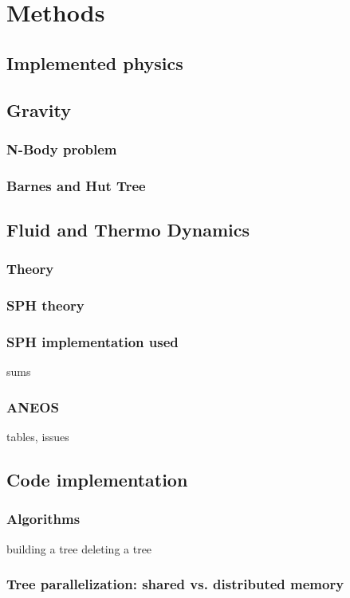 \graphicspath{{./02figs/}}

\chapter{Methods}
%

\section{Implemented physics}
\section{Gravity}
\subsection{N-Body problem}
\subsection{Barnes and Hut Tree}

\section{Fluid and Thermo Dynamics}
\subsection{Theory}
\subsection{SPH theory}
\subsection{SPH implementation used}
sums
\subsection{ANEOS}
tables, issues

\section{Code implementation}
\subsection{Algorithms}
building a tree
deleting a tree

\subsection{Tree parallelization: shared vs. distributed memory}


